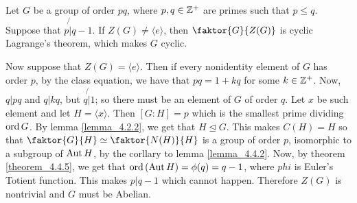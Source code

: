 \begin{example}\label{example_4.11}
  Let $G$ be a group of order $pq$, where $p,q \in \mathbb{Z}^+$ are primes such that
  $p \leq q$. Suppose that  $p \not{|} q-1$. If $Z(G) \neq \langle e
  \rangle$, then $\faktor{G}{Z(G)}$ is cyclic Lagrange's theorem, which makes
  $G$ cyclic.

  Now suppose that $Z(G)=\langle e \rangle$. Then if every nonidentity
  element of $G$ has order  $p$, by the class equation, we have that
  $pq=1+kq$ for some  $k \in \mathbb{Z}^+$. Now,  $q|pq$ and  $q|kq$, but  $q \not{|}
  1$; so there must be an element of $G$ of order $q$. Let $x$ be such
  element and let  $H=\langle x \rangle$. Then $[G:H]=p$ which is the
  smallest prime dividing $\operatorname{ord}{G}$. By lemma \ref{lemma_4.2.2}, we get that $H
  \unlhd G$. This makes  $C(H)=H$ so that $\faktor{G}{H} \simeq
  \faktor{N(H)}{H}$ is a group of order $p$, isomorphic to a subgroup of
  $\operatorname{Aut}{H}$, by the corllary to lemma \ref{lemma_4.4.2}. Now, by theorem
  \ref{theorem_4.4.5}, we get that $\operatorname{ord}{(\operatorname{Aut}{H})}=\phi(q)=q-1$, where $phi$ is
  Euler's Totient function. This makes $p|q-1$ which cannot happen. Therefore
  $Z(G)$ is nontrivial and $G$ must be Abelian.
\end{example}


